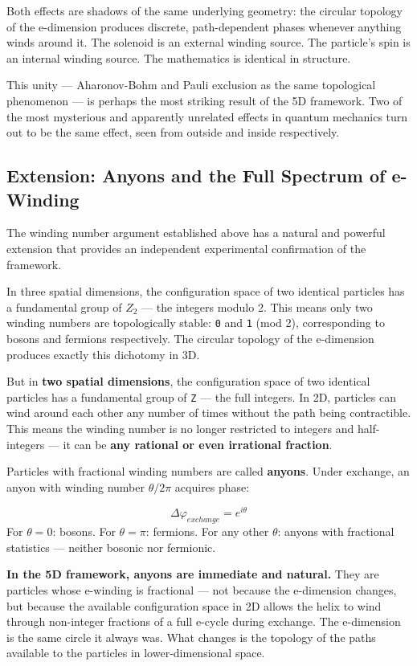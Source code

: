 \documentclass[aps,prd,preprint,superscriptaddress,longbibliography,floatfix]{revtex4-2}
\theoremstyle{remark}
\begin{document}
Both effects are shadows of the same underlying geometry: the circular topology of the e-dimension produces discrete, path-dependent phases whenever anything winds around it. The solenoid is an external winding source. The particle's spin is an internal winding source. The mathematics is identical in structure.

This unity --- Aharonov-Bohm and Pauli exclusion as the same topological phenomenon --- is perhaps the most striking result of the 5D framework. Two of the most mysterious and apparently unrelated effects in quantum mechanics turn out to be the same effect, seen from outside and inside respectively.



\subsection{Extension: Anyons and the Full Spectrum of e-Winding}

The winding number argument established above has a natural and powerful extension that provides an independent experimental confirmation of the framework.

In three spatial dimensions, the configuration space of two identical particles has a fundamental group of $Z_{2}$ --- the integers modulo 2. This means only two winding numbers are topologically stable: \texttt{0} and \texttt{1} (mod 2), corresponding to bosons and fermions respectively. The circular topology of the e-dimension produces exactly this dichotomy in 3D.

But in \textbf{two spatial dimensions}, the configuration space of two identical particles has a fundamental group of \texttt{Z} --- the full integers. In 2D, particles can wind around each other any number of times without the path being contractible. This means the winding number is no longer restricted to integers and half-integers --- it can be \textbf{any rational or even irrational fraction}.

Particles with fractional winding numbers are called \textbf{anyons}. Under exchange, an anyon with winding number $\theta/2\pi$ acquires phase:


\begin{equation}
    \Delta\varphi_{exchange} = e^{i\theta}
\end{equation}
For $\theta = 0$: bosons. For $\theta = \pi$: fermions. For any other $\theta$: anyons with fractional statistics --- neither bosonic nor fermionic.

\textbf{In the 5D framework, anyons are immediate and natural.} They are particles whose e-winding is fractional --- not because the e-dimension changes, but because the available configuration space in 2D allows the helix to wind through non-integer fractions of a full e-cycle during exchange. The e-dimension is the same circle it always was. What changes is the topology of the paths available to the particles in lower-dimensional space.
\end{document}

